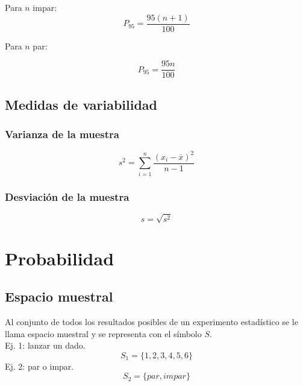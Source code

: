 \documentclass{report}
\begin{document}
            \indent Para $n$ impar:
            \begin{equation*}
              P_95=\frac{95(n+1)}{100}
            \end{equation*}

            Para $n$ par:

            \begin{equation*}
              P_95=\frac{95n}{100}
            \end{equation*}

    \section*{Medidas de variabilidad}
      
      \subsection*{Varianza de la muestra}
        
        \begin{equation*}
          s^2=\sum_{i=1}^n\frac{(x_i-\overline{x})^2}{n-1}
        \end{equation*}

      \subsection*{Desviación de la muestra}

        \begin{equation*}
          s=\sqrt{s^2}
        \end{equation*}
  \chapter*{Probabilidad}
    
    \section*{Espacio muestral}
      Al conjunto de todos los resultados posibles de un experimento estadístico 
      se le llama espacio muestral y se representa con el símbolo $S$.\\
      \indent Ej. 1: lanzar un dado.
      \begin{equation*}
        S_1=\{1, 2, 3, 4, 5, 6\}
      \end{equation*}
      \indent Ej. 2: par o impar.
      \begin{equation*}
        S_2=\{par, impar\}
      \end{equation*}
\end{document}
